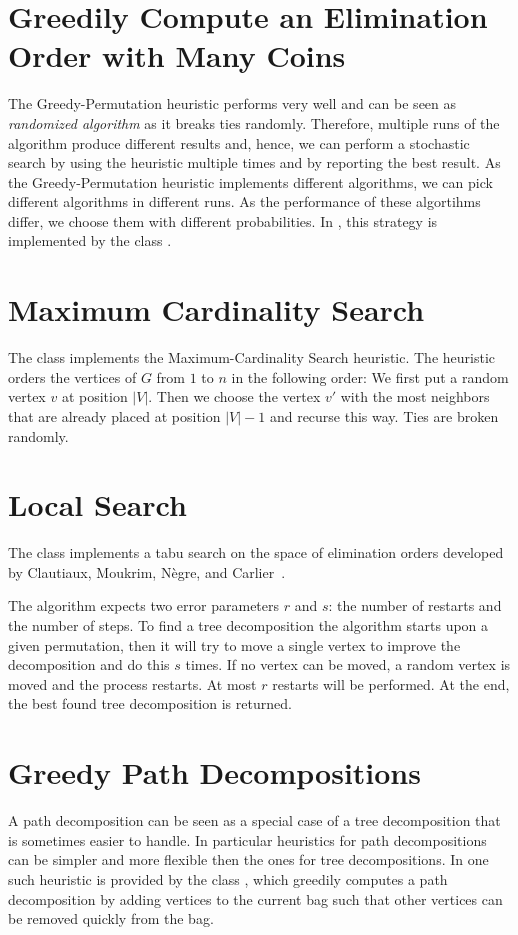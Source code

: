 \documentclass[a4paper, ukenglish, twoside, openright]{jdrasilmanual}
\begin{document}
\section{Greedily Compute an Elimination Order with Many Coins}
The Greedy-Permutation heuristic performs very well and can be seen as
\emph{randomized algorithm} as it breaks ties randomly.  Therefore,
multiple runs of the algorithm produce different results and, hence,
we can perform a stochastic search by using the heuristic multiple
times and by reporting the best result. As the
Greedy-Permutation heuristic implements different algorithms, we can
pick different algorithms in different runs. As the performance of
these algortihms differ, we choose them with different probabilities.
In \Jdrasil{}, this strategy is implemented by the class .

\section{Maximum Cardinality Search}
The class  implements the
Maximum-Cardinality Search heuristic. The heuristic orders the vertices
of $G$ from $1$ to $n$ in the following order: We first put a
random vertex $v$ at position $|V|$. Then we choose the vertex $v'$
with the most neighbors that are already placed at position $|V|-1$
and recurse this way. Ties are broken randomly.

\section{Local Search}
The class  implements a tabu search on
the space of elimination orders developed by Clautiaux, Moukrim,
N{\`e}gre, and Carlier~\cite{clautiaux2004heuristic}.

The algorithm expects two error parameters $r$ and $s$: the number of
restarts and the number of steps.  To find a tree decomposition the
algorithm starts upon a given permutation, then it will try to move a
single vertex to improve the decomposition and do this $s$ times. If
no vertex can be moved, a random vertex is moved and the process
restarts. At most $r$ restarts will be performed.  At the end, the
best found tree decomposition is returned.

\section{Greedy Path Decompositions}
A path decomposition can be seen as a special case of a tree
decomposition that is sometimes easier to handle. In particular
heuristics for path decompositions can be simpler and more flexible
then the ones for tree decompositions. In \Jdrasil{} one such
heuristic is provided by the class ,
which greedily computes a path decomposition by adding vertices to the
current bag such that other vertices can be removed quickly from the bag.
\end{document}
